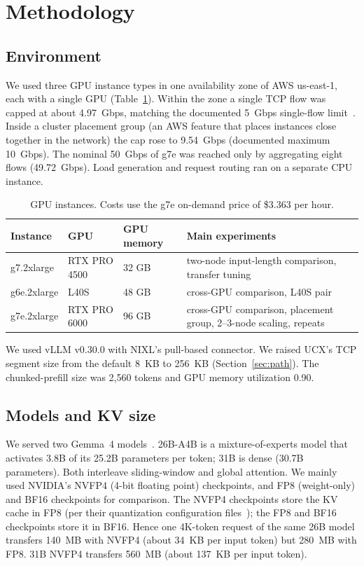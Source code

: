 \documentclass[11pt]{article}
\begin{document}
\section{Methodology}

\subsection{Environment}
We used three GPU instance types in one availability zone of AWS us-east-1, each with a single GPU (Table~\ref{tab:instances}). Within the zone a single TCP flow was capped at about 4.97~Gbps, matching the documented 5~Gbps single-flow limit~\cite{awsbw}. Inside a cluster placement group (an AWS feature that places instances close together in the network) the cap rose to 9.54~Gbps (documented maximum 10~Gbps). The nominal 50~Gbps of g7e was reached only by aggregating eight flows (49.72~Gbps). Load generation and request routing ran on a separate CPU instance.

\begin{table}[!htbp]
\centering\small
\begin{tabularx}{\linewidth}{lllX}
\toprule
Instance & GPU & GPU memory & Main experiments \\
\midrule
g7.2xlarge  & RTX PRO 4500 & 32 GB & two-node input-length comparison, transfer tuning \\
g6e.2xlarge & L40S         & 48 GB & cross-GPU comparison, L40S pair \\
g7e.2xlarge & RTX PRO 6000 & 96 GB & cross-GPU comparison, placement group, 2--3-node scaling, repeats \\
\bottomrule
\end{tabularx}
\caption{GPU instances. Costs use the g7e on-demand price of \$3.363 per hour.}
\label{tab:instances}
\end{table}

We used vLLM v0.30.0 with NIXL's pull-based connector. We raised UCX's TCP segment size from the default 8~KB to 256~KB (Section~\ref{sec:path}). The chunked-prefill size was 2,560 tokens and GPU memory utilization 0.90.

\subsection{Models and KV size}
We served two Gemma~4 models~\cite{gemma4}. 26B-A4B is a mixture-of-experts model that activates 3.8B of its 25.2B parameters per token; 31B is dense (30.7B parameters). Both interleave sliding-window and global attention. We mainly used NVIDIA's NVFP4 (4-bit floating point) checkpoints, and FP8 (weight-only) and BF16 checkpoints for comparison. The NVFP4 checkpoints store the KV cache in FP8 (per their quantization configuration files~\cite{nvfp4ckpt}); the FP8 and BF16 checkpoints store it in BF16. Hence one 4K-token request of the same 26B model transfers 140~MB with NVFP4 (about 34~KB per input token) but 280~MB with FP8. 31B NVFP4 transfers 560~MB (about 137~KB per input token).
\end{document}
